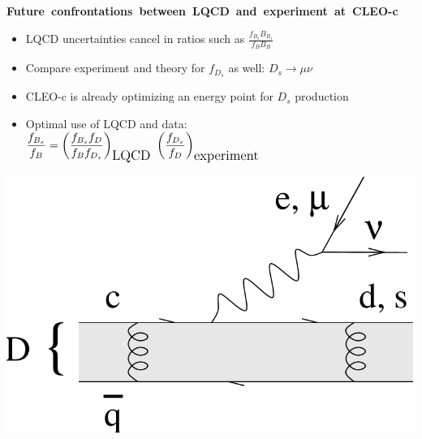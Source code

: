 \documentclass[landscape]{article}
\newenvironment{slide}[1][ ]{\mbox{\bf #1 } \vfill}{\vfill \mbox{ } \pagebreak}
\begin{document}










\begin{slide}[Future confrontations between LQCD and experiment at CLEO-c]

\begin{itemize}\setlength{\itemsep}{0.5 cm}

  \item LQCD uncertainties cancel in ratios such as $\displaystyle \frac{f_{B_s} B_{B_s}}{f_B B_B}$

  \item Compare experiment and theory for $f_{D_s}$ as well: $D_s \to \mu \nu$

  \item CLEO-c is already optimizing an energy point for $D_s$ production

  \item Optimal use of LQCD and data: $\displaystyle \frac{f_{B_s}}{f_B} = \left(\frac{f_{B_s} f_D}{f_B f_{D_s}}\right)_{\mbox{\large LQCD}} \ \left(\frac{f_{D_s}}{f_D}\right)_{\mbox{\large experiment}}$

\end{itemize}

\begin{center}
  \includegraphics[width=0.5\linewidth]{diagram_semileptonic}
\end{center}

\end{slide}
\end{document}
